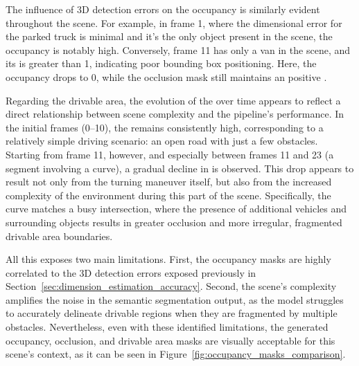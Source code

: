 The influence of 3D detection errors on the occupancy  is similarly evident throughout the scene. For example, in frame 1, where the dimensional error for the parked truck is minimal and it's the only object present in the scene, the occupancy  is notably high. Conversely, frame 11 has only a van in the scene, and its  is greater than 1, indicating poor bounding box positioning. Here, the occupancy  drops to 0, while the occlusion mask still maintains an positive .

Regarding the drivable area, the evolution of the  over time appears to reflect a direct relationship between scene complexity and the pipeline's performance. In the initial frames (0–10), the  remains consistently high, corresponding to a relatively simple driving scenario: an open road with just a few obstacles. Starting from frame 11, however, and especially between frames 11 and 23 (a segment involving a curve), a gradual decline in  is observed. This drop appears to result not only from the turning maneuver itself, but also from the increased complexity of the environment during this part of the scene. Specifically, the curve matches a busy intersection, where the presence of additional vehicles and surrounding objects results in greater occlusion and more irregular, fragmented drivable area boundaries.

All this exposes two main limitations. First, the occupancy masks are highly correlated to the 3D detection errors exposed previously in Section~\ref{sec:dimension_estimation_accuracy}. Second, the scene's complexity amplifies the noise in the semantic segmentation output, as the model struggles to accurately delineate drivable regions when they are fragmented by multiple obstacles. Nevertheless, even with these identified limitations, the generated occupancy, occlusion, and drivable area masks are visually acceptable for this scene's context, as it can be seen in Figure~\ref{fig:occupancy_masks_comparison}.

